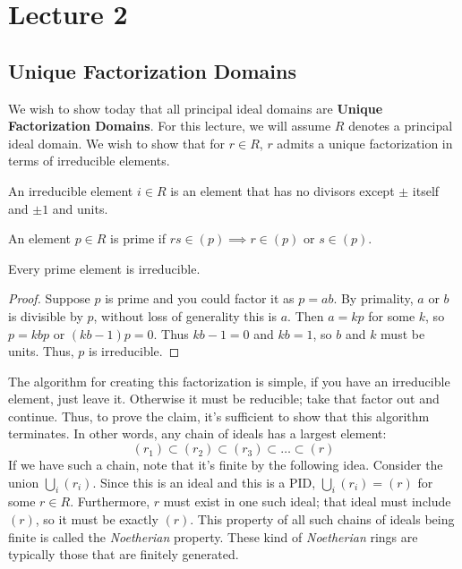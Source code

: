 \section{Lecture 2}

\subsection{Unique Factorization Domains}
We wish to show today that all principal ideal domains are \textbf{Unique Factorization Domains}.
For this lecture, we will assume $R$ denotes a principal ideal domain. We wish to show that
for $r \in R$, $r$ admits a unique factorization in terms of irreducible elements. 
\begin{definition}
    An irreducible element $i \in R$ is an element that has no divisors except $\pm$ itself and $\pm 1$ and units.
\end{definition}
\begin{definition}
    An element $p \in R$ is prime if $rs \in (p) \implies r \in (p)$ or $s \in (p)$.
\end{definition}
\begin{theorem}
    Every prime element is irreducible.
    \begin{proof}
        Suppose $p$ is prime and you could factor it as $p = ab$. By primality, $a$ or $b$ is divisible by $p$, without loss
        of generality this is $a$. Then $a = kp$ for some $k$, so $p = kbp$ or $(kb - 1)p = 0$. Thus $kb - 1 = 0$ and $kb = 1$, so $b$ and $k$ must be units.
        Thus, $p$ is irreducible.
    \end{proof}
\end{theorem}
The algorithm for
creating this factorization is simple, if you have an irreducible element, just leave it. Otherwise it must be reducible; take that
factor out and continue.
Thus, to prove the claim, it's sufficient to show that this algorithm terminates. In other words, any chain of ideals
has a largest element:
\[ (r_1) \subset (r_2) \subset (r_3) \subset \dots \subset (r) \]
If we have such a chain, note that it's finite by the following idea. Consider the union $\bigcup_i (r_i)$.
Since this is an ideal and this is a PID, $\bigcup_i (r_i) = (r)$ for some $r \in R$. Furthermore, $r$
must exist in one such ideal; that ideal must include $(r)$, so it must be exactly $(r)$. 
This property of all such chains of ideals being finite is called the \textit{Noetherian} property.
These kind of \textit{Noetherian} rings are typically those that are finitely generated.

